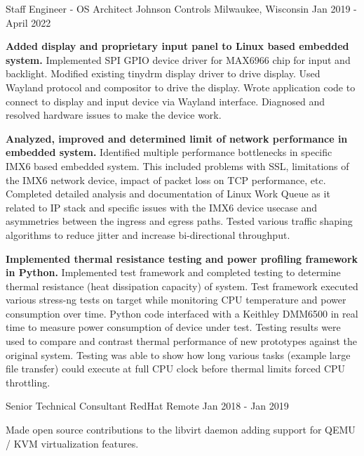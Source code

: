 \begin{cventries}
  \cventry
    {Staff Engineer - OS Architect} %
    {Johnson Controls} %
    {Milwaukee, Wisconsin} %
    {Jan 2019 - April 2022} %
    {
      \begin{cvitems} %
      \item {\textbf{Added display and proprietary input panel to Linux based embedded system.}
        Implemented SPI GPIO device driver for MAX6966 chip for input and backlight.
        Modified existing tinydrm display driver to drive display.
        Used Wayland protocol and compositor to drive the display.
        Wrote application code to connect to display and input device via Wayland interface.
        Diagnosed and resolved hardware issues to make the device work.
      }
      \item {\textbf{Analyzed, improved and determined limit of network performance in embedded system.}
        Identified multiple performance bottlenecks in specific IMX6 based embedded system.
        This included problems with SSL, limitations of the IMX6 network device, impact of packet loss on TCP performance, etc.
        Completed detailed analysis and documentation of Linux Work Queue as it related to IP stack and specific issues with the IMX6 device usecase and asymmetries between the ingress and egress paths.
        Tested various traffic shaping algorithms to reduce jitter and increase bi-directional throughput.
      }
      \item {\textbf{Implemented thermal resistance testing and power profiling framework in Python.}
        Implemented test framework and completed testing to determine thermal resistance (heat dissipation capacity) of system.
        Test framework executed various stress-ng tests on target while monitoring CPU temperature and power consumption over time.
        Python code interfaced with a Keithley DMM6500 in real time to measure power consumption of device under test.
        Testing results were used to compare and contrast thermal performance of new prototypes against the original system.
        Testing was able to show how long various tasks (example large file transfer) could execute at full CPU clock before thermal limits forced CPU throttling.
      }
      \end{cvitems}
    }

  \cventry
    {Senior Technical Consultant} %
    {RedHat} %
    {Remote} %
    {Jan 2018 - Jan 2019} %
    {
      \begin{cvitems} %
      \item {Made open source contributions to the libvirt daemon adding support for QEMU / KVM virtualization features.}
      \end{cvitems}
    }


\end{cventries}

